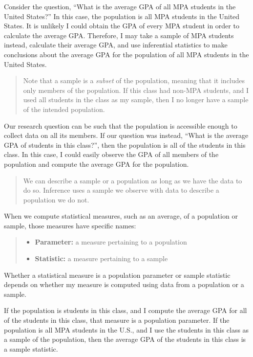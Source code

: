 \documentclass[
]{book}
\providecommand{\tightlist}{%
  \setlength{\itemsep}{0pt}\setlength{\parskip}{0pt}}
\begin{document}
Consider the question, ``What is the average GPA of all MPA students in the United States?'' In this case, the population is all MPA students in the United States. It is unlikely I could obtain the GPA of every MPA student in order to calculate the average GPA. Therefore, I may take a sample of MPA students instead, calculate their average GPA, and use inferential statistics to make conclusions about the average GPA for the population of all MPA students in the United States.

\begin{quote}
Note that a sample is a \emph{subset} of the population, meaning that it includes only members of the population. If this class had non-MPA students, and I used all students in the class as my sample, then I no longer have a sample of the intended population.
\end{quote}

Our research question can be such that the population is accessible enough to collect data on all its members. If our question was instead, ``What is the average GPA of students in this class?'', then the population is all of the students in this class. In this case, I could easily observe the GPA of all members of the population and compute the average GPA for the population.

\begin{quote}
We can describe a sample or a population as long as we have the data to do so. Inference uses a sample we observe with data to describe a population we do not.
\end{quote}

When we compute statistical measures, such as an average, of a population or sample, those measures have specific names:

\begin{quote}
\begin{itemize}
\tightlist
\item
  \textbf{Parameter:} a measure pertaining to a population
\item
  \textbf{Statistic:} a measure pertaining to a sample
\end{itemize}
\end{quote}

Whether a statistical measure is a population parameter or sample statistic depends on whether my measure is computed using data from a population or a sample.

If the population is students in this class, and I compute the average GPA for all of the students in this class, that measure is a population parameter. If the population is all MPA students in the U.S., and I use the students in this class as a sample of the population, then the average GPA of the students in this class is a sample statistic.
\end{document}
